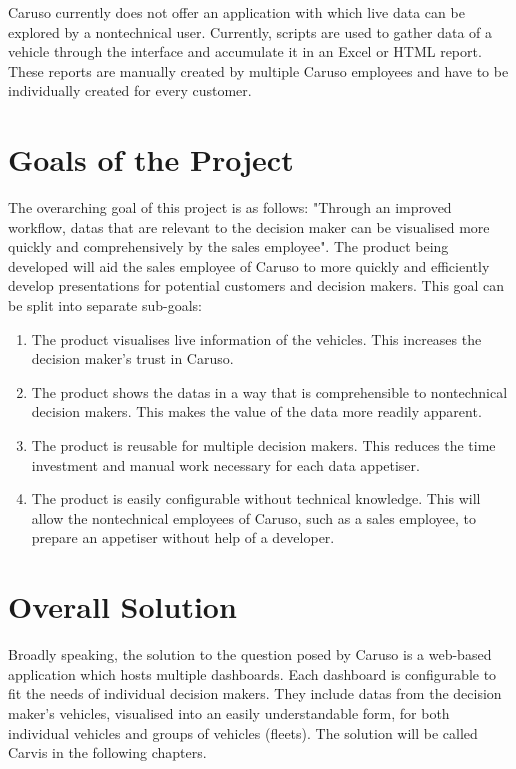 Caruso currently does not offer an application with which live data can be explored by a \gls{nontechnical} user. Currently, scripts are used to gather data of a vehicle through the interface and accumulate it in an Excel or HTML report. These reports are manually created by multiple Caruso employees and have to be individually created for every customer.

\section{Goals of the Project}
The overarching goal of this project is as follows: "Through an improved workflow, \glspl{data} that are relevant to the decision maker can be visualised more quickly and comprehensively by the sales employee". The product being developed will aid the sales employee of Caruso to more quickly and efficiently develop presentations for potential customers and decision makers. This goal can be split into separate sub-goals: 
\begin{enumerate}
  \item The product visualises live information of the vehicles. This increases the decision maker's trust in Caruso.
  \item The product shows the \glspl{data} in a way that is comprehensible to \gls{nontechnical} decision makers. This makes the value of the data more readily apparent.
  \item The product is reusable for multiple decision makers. This reduces the time investment and manual work necessary for each data \gls{appetiser}.
  \item The product is easily configurable without technical knowledge. This will allow the \gls{nontechnical} employees of Caruso, such as a sales employee, to prepare an \gls{appetiser} without help of a developer.
\end{enumerate}

\section{Overall Solution}
Broadly speaking, the solution to the question posed by Caruso is a web-based application which hosts multiple dashboards. Each dashboard is configurable to fit the needs of individual decision makers. They include \glspl{data} from the decision maker's vehicles, visualised into an easily understandable form, for both individual vehicles and groups of vehicles (fleets). The solution will be called Carvis in the following chapters.